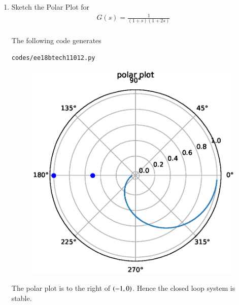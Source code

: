 \begin{enumerate}[label=\thesubsection.\arabic*.,ref=\thesubsection.\theenumi]
\item
Sketch the Polar Plot for
\begin{align}
G(s) = \frac{1}{(1+s)(1+2s)}
\end{align}
\\
\solution  The following code generates
%
\begin{lstlisting}
codes/ee18btech11012.py
\end{lstlisting}
%
\begin{figure}
    \centering
    \includegraphics[width=\columnwidth]{./figs/ee18btech11012.eps}
    \caption{}
    \label{fig:ee18btech11012}
\end{figure}
%
The polar plot is to the right of $\left(-1,0\right)$.  Hence the closed loop system is stable.
%
\end{enumerate}
